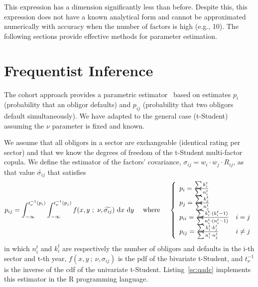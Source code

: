 \documentclass[11pt,fleqn]{book} %
\begin{document}
This expression has a dimension significantly less than before. Despite 
this, this expression does not have a known analytical form and cannot 
be approximated numerically with accuracy when the number of factors is 
high (e.g., 10). The following sections provide effective methods for 
parameter estimation.

\section{Frequentist Inference}

The cohort approach provides a parametric estimator~\cite[sec. 3.1]{castro:2007} 
based on estimates $p_i$ (probability that an obligor defaults) and 
$p_{ij}$ (probability that two obligors default simultaneously).
We have adapted to the general case (t-Student) assuming the $\nu$ parameter 
is fixed and known.

\begin{definition}
	We assume that all obligors in a sector are exchangeable (identical rating 
	per sector) and that we know the degrees of freedom of the t-Student 
	multi-factor copula. We define the estimator of the factors' covariance, 
	$\sigma_{ij} = w_i \cdot w_j \cdot R_{ij}$, as that value 
	$\widetilde{\sigma_{ij}}$ that satisfies
	\begin{displaymath}
		p_{ij} = \displaystyle \int_{-\infty}^{t_{\nu}^{-1}(p_i)} \int_{-\infty}^{t_{\nu}^{-1}(p_j)} 
		f(x,y\ ;\ \nu, \widetilde{\sigma_{ij}}) \mathop{\,\mathrm{{}d}}\mathopen{} x \mathop{\,\mathrm{{}d}}\mathopen{} y
		\quad \text{ where } \quad
		\left\{
			\begin{array}{ll}
				p_i = \frac{\sum k_i^t}{\sum n_i^t} & \\
				p_j = \frac{\sum k_j^t}{\sum n_j^t} & \\
				p_{ii} = \frac{\sum k_i^t \cdot (k_i^t-1)}{\sum n_i^t \cdot (n_i^t-1)} & i = j \\
				p_{ij} = \frac{\sum k_i^t \cdot k_j^t}{\sum n_i^t \cdot n_j^t} & i \ne j \\
			\end{array}
		\right.
	\end{displaymath}
	in which $n_i^t$ and $k_i^t$ are respectively the number of obligors and 
	defaults in the i-th sector and t-th year, $f(x,y\ ;\ \nu,\sigma_{ij})$ 
	is the pdf of the bivariate t-Student, and $t_{\nu}^{-1}$ is the inverse 
	of the cdf of the univariate t-Student. Listing~\ref{sc:qadc} implements 
	this estimator in the R programming language.
\end{definition}
\end{document}
